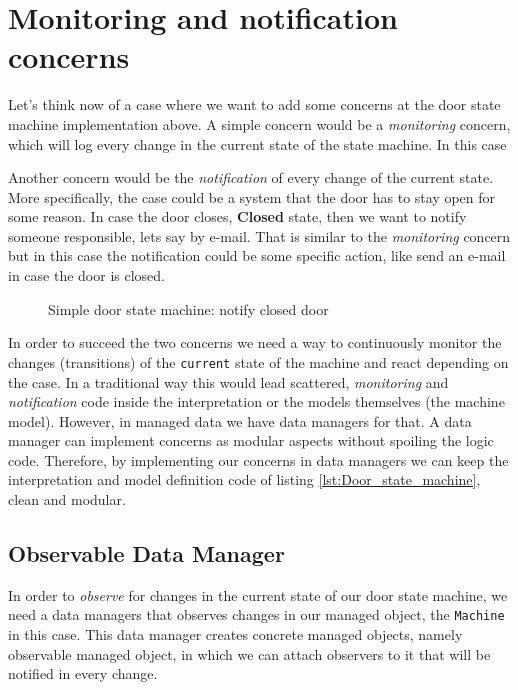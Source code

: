 \section{Monitoring and notification concerns}
Let's think now of a case where we want to add some concerns at the door state machine implementation above.
A simple concern would be a \textit{monitoring} concern, which will log every change in the current state of the state machine.
In this case 

Another concern would be the \textit{notification} of every change of the current state. 
More specifically, the case could be a system that the door has to stay open for some reason. In case the door closes, \textbf{Closed} state, then we want to notify someone responsible, lets say by e-mail.
That is similar to the \textit{monitoring} concern but in this case the notification could be some specific action, like send an e-mail in case the door is closed.

\begin{figure}[H]
	\centering
  	\caption{Simple door state machine: notify closed door}
  	\label{fig:State_machine_danger}
\end{figure}

In order to succeed the two concerns we need a way to continuously monitor the changes (transitions) of the \texttt{current} state of the machine and react depending on the case.
In a traditional way this would lead scattered, \textit{monitoring} and \textit{notification} code inside the interpretation or the models themselves (the machine model).
However, in managed data we have data managers for that.
A data manager can implement concerns as modular aspects without spoiling the logic code.
Therefore, by implementing our concerns in data managers we can keep the interpretation and model definition code of listing \ref{lst:Door_state_machine}, clean and modular.

\subsection{Observable Data Manager}
In order to \textit{observe} for changes in the current state of our door state machine, we need a data managers that observes changes in our managed object, the \texttt{Machine} in this case.
This data manager creates concrete managed objects, namely observable managed object, in which we can attach observers to it that will be notified in every change.

